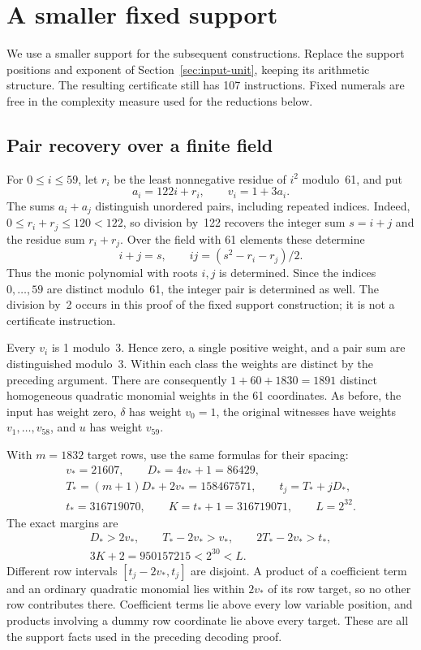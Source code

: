 \section{A smaller fixed support}\label{sec:modular-support}

We use a smaller support for the subsequent constructions. Replace the
support positions and exponent of Section~\ref{sec:input-unit}, keeping
its arithmetic structure. The resulting certificate still has 107
instructions. Fixed numerals are free in the complexity measure used
for the reductions below.

\subsection{Pair recovery over a finite field}

For $0\le i\le59$, let $r_i$ be the least nonnegative residue of $i^2$
modulo~61, and put
\[
 a_i=122i+r_i,\qquad v_i=1+3a_i.
\]
The sums $a_i+a_j$ distinguish unordered pairs, including repeated
indices. Indeed, $0\le r_i+r_j\le120<122$, so division by~122 recovers
the integer sum $s=i+j$ and the residue sum $r_i+r_j$. Over the field
with 61 elements these determine
\[
 i+j=s,\qquad ij=(s^2-r_i-r_j)/2.
\]
Thus the monic polynomial with roots $i,j$ is determined. Since the
indices $0,\ldots,59$ are distinct modulo~61, the integer pair is
determined as well. The division by~2 occurs in this proof of the
fixed support construction; it is not a certificate instruction.

Every $v_i$ is 1 modulo~3. Hence zero, a single positive weight, and
a pair sum are distinguished modulo~3. Within each class the weights
are distinct by the preceding argument. There are consequently
$1+60+1830=1891$ distinct homogeneous quadratic monomial weights in
the 61 coordinates. As before, the input has weight zero, $\delta$
has weight $v_0=1$, the original witnesses have weights $v_1,\ldots,v_{58}$,
and $u$ has weight $v_{59}$.

With $m=1832$ target rows, use the same formulas for their spacing:
\[
\begin{gathered}
 v_*=21607,\qquad D_*=4v_*+1=86429,\\
 T_*=(m+1)D_*+2v_*=158467571,\qquad t_j=T_*+jD_*,\\
 t_*=316719070,\qquad K=t_*+1=316719071,\qquad L=2^{32}.
\end{gathered}
\]
The exact margins are
\[
\begin{gathered}
 D_*>2v_*,\qquad T_*-2v_*>v_*,\qquad 2T_*-2v_*>t_*,\\
 3K+2=950157215<2^{30}<L.
\end{gathered}
\]
Different row intervals $[t_j-2v_*,t_j]$ are disjoint. A product of
a coefficient term and an ordinary quadratic monomial lies within
$2v_*$ of its row target, so no other row contributes there. Coefficient
terms lie above every low variable position, and products involving a
dummy row coordinate lie above every target. These are all the support
facts used in the preceding decoding proof.

